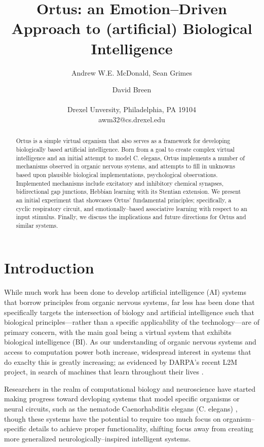 \documentclass[letterpaper]{article}
\title{Ortus: an Emotion--Driven Approach to (artificial) Biological Intelligence}
\author{Andrew W.E. McDonald, Sean Grimes \and David Breen \\
\mbox{}\\
Drexel Unversity, Philadelphia, PA 19104 \\
awm32@cs.drexel.edu} %
\begin{document}
\maketitle

\begin{abstract}
 Ortus is a simple virtual organism that also serves as a framework for developing biologically based artificial intelligence. Born from a goal to create complex virtual intelligence and an initial attempt to model C. elegans, Ortus implements a number of mechanisms observed in organic nervous systems, and attempts to fill in unknowns based upon plausible biological implementations, psychological observations. Implemented mechanisms include excitatory and inhibitory chemical synapses, bidirectional gap junctions, Hebbian learning with its Stentian extension.  We present an initial experiment that showcases Ortus’ fundamental principles; specifically, a cyclic respiratory circuit, and emotionally--based associative learning with respect to an input stimulus. Finally, we discuss the implications and future directions for Ortus and similar systems.


\end{abstract}

\section{Introduction}


While much work has been done to develop artificial intelligence (AI) systems that borrow principles from organic nervous systems, far less has been done that specifically targets the intersection of biology and artificial intelligence such that biological principles---rather than a specific applicability of the technology---are of primary concern, with the main goal being a virtual system that exhibits biological intelligence (BI). As our understanding of organic nervous systems and access to computation power both increase, widespread interest in systems that do exaclty this is greatly increasing; as evidenced by DARPA's recent L2M project, in search of machines that learn throughout their lives \citep{darpa}.


Researchers in the realm of computational biology and neuroscience have started making progress toward devloping systems that model specific organisms or neural circuits, such as the nematode Caenorhabditis elegans (C. elegans) \citep{Izquierdo2016}, though these systems have the potential to require too much focus on organism--specific details to achieve proper functionality, shifting focus away from creating more generalized neurologically--inspired intelligent systems.
\end{document}
